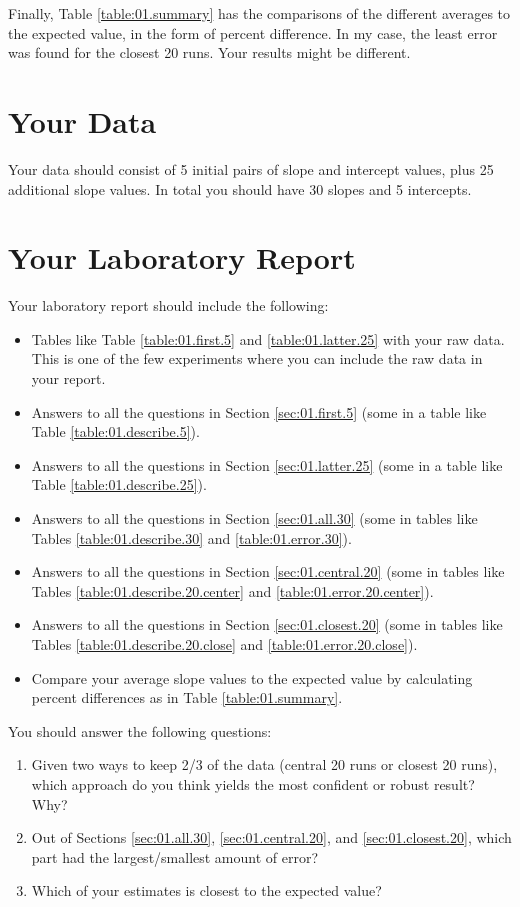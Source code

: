 Finally, Table \ref{table:01.summary} has the comparisons of the different averages to the expected value, in the form of percent difference. In my case, the least error was found for the closest 20 runs. Your results might be different.
\section{Your Data}
Your data should consist of 5 initial pairs of slope and intercept values, plus 25 additional slope values. In total you should have 30 slopes and 5 intercepts.
\newpage
\section{Your Laboratory Report}
Your laboratory report should include the following:
\begin{itemize}
    \item Tables like Table \ref{table:01.first.5} and \ref{table:01.latter.25} with your raw data. This is one of the few experiments where you can include the raw data in your report.
    \item Answers to all the questions in Section \ref{sec:01.first.5} (some in a table like Table \ref{table:01.describe.5}).
    \item Answers to all the questions in Section \ref{sec:01.latter.25} (some in a table like Table \ref{table:01.describe.25}).
    \item Answers to all the questions in Section \ref{sec:01.all.30} (some in tables like Tables \ref{table:01.describe.30} and \ref{table:01.error.30}).
    \item Answers to all the questions in Section \ref{sec:01.central.20} (some in tables like Tables \ref{table:01.describe.20.center} and \ref{table:01.error.20.center}).
    \item Answers to all the questions in Section \ref{sec:01.closest.20} (some in tables like Tables \ref{table:01.describe.20.close} and \ref{table:01.error.20.close}).
    \item Compare your average slope values to the expected value by calculating percent differences as in Table \ref{table:01.summary}.
\end{itemize}
You should answer the following questions:
\begin{enumerate}
    \item Given two ways to keep 2/3 of the data (central 20 runs or closest 20 runs), which approach do you think yields the most confident or robust result? Why?
    \item Out of Sections \ref{sec:01.all.30}, \ref{sec:01.central.20}, and \ref{sec:01.closest.20}, which part had the largest/smallest amount of error?
    \item Which of your estimates is closest to the expected value?
\end{enumerate}
\newpage
